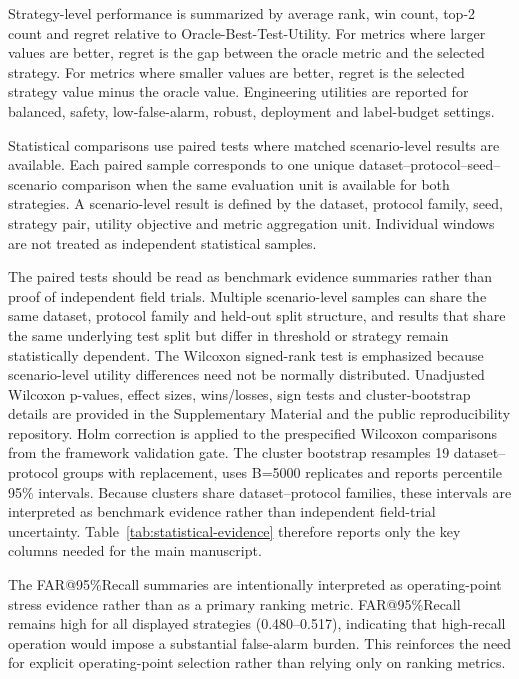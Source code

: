 Strategy-level performance is summarized by average rank, win count, top-2 count and regret relative to Oracle-\allowbreak Best-\allowbreak Test-\allowbreak Utility. For metrics where larger values are better, regret is the gap between the oracle metric and the selected strategy. For metrics where smaller values are better, regret is the selected strategy value minus the oracle value. Engineering utilities are reported for balanced, safety, low-false-alarm, robust, deployment and label-budget settings.



Statistical comparisons use paired tests where matched scenario-level results are available. Each paired sample corresponds to one unique dataset--protocol--seed--scenario comparison when the same evaluation unit is available for both strategies. A scenario-level result is defined by the dataset, protocol family, seed, strategy pair, utility objective and metric aggregation unit. Individual windows are not treated as independent statistical samples.

The paired tests should be read as benchmark evidence summaries rather than proof of independent field trials. Multiple scenario-level samples can share the same dataset, protocol family and held-out split structure, and results that share the same underlying test split but differ in threshold or strategy remain statistically dependent. The Wilcoxon signed-rank test is emphasized because scenario-level utility differences need not be normally distributed. Unadjusted Wilcoxon p-values, effect sizes, wins/losses, sign tests and cluster-bootstrap details are provided in the Supplementary Material and the public reproducibility repository. Holm correction is applied to the prespecified Wilcoxon comparisons from the framework validation gate. The cluster bootstrap resamples 19 dataset--protocol groups with replacement, uses B=5000 replicates and reports percentile 95\% intervals. Because clusters share dataset--protocol families, these intervals are interpreted as benchmark evidence rather than independent field-trial uncertainty. Table~\ref{tab:statistical-evidence} therefore reports only the key columns needed for the main manuscript.





The FAR@95\%Recall summaries are intentionally interpreted as operating-point stress evidence rather than as a primary ranking metric. FAR@95\%Recall remains high for all displayed strategies (0.480--0.517), indicating that high-recall operation would impose a substantial false-alarm burden. This reinforces the need for explicit operating-point selection rather than relying only on ranking metrics.





